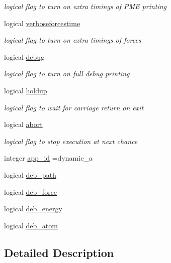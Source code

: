 \begin{DoxyCompactItemize}
\begin{DoxyCompactList}\small\item\em logical flag to turn on extra timings of P\-M\-E printing \end{DoxyCompactList}\item 
logical \hyperlink{classinform_a2d1a4bc4e4b22f41eeb347c67e4073a4}{verboseforcestime}
\begin{DoxyCompactList}\small\item\em logical flag to turn on extra timings of forces \end{DoxyCompactList}\item 
logical \hyperlink{classinform_a18f9ce5387ced589c9fd318ff053e26c}{debug}
\begin{DoxyCompactList}\small\item\em logical flag to turn on full debug printing \end{DoxyCompactList}\item 
logical \hyperlink{classinform_a4178ee8299689a2c8c3067ea907dc969}{holdup}
\begin{DoxyCompactList}\small\item\em logical flag to wait for carriage return on exit \end{DoxyCompactList}\item 
logical \hyperlink{classinform_a7b064480f04afeeb78427a994974fe57}{abort}
\begin{DoxyCompactList}\small\item\em logical flag to stop execution at next chance \end{DoxyCompactList}\item 
integer \hyperlink{classinform_a3a4881b89f8850fdd49040ea3fc007b2}{app\-\_\-id} =dynamic\-\_\-a
\item 
logical \hyperlink{classinform_a371bdb361b48a1ce1cc01a8c070d2fac}{deb\-\_\-path}
\item 
logical \hyperlink{classinform_a914565a9c51b80a196131eb9a7d61263}{deb\-\_\-force}
\item 
logical \hyperlink{classinform_a77409b00f6f426775852f12fb6a2891d}{deb\-\_\-energy}
\item 
logical \hyperlink{classinform_ad1e4bda31e728b83a1a85490235ed3ee}{deb\-\_\-atom}
\end{DoxyCompactItemize}


\subsection{Detailed Description}


